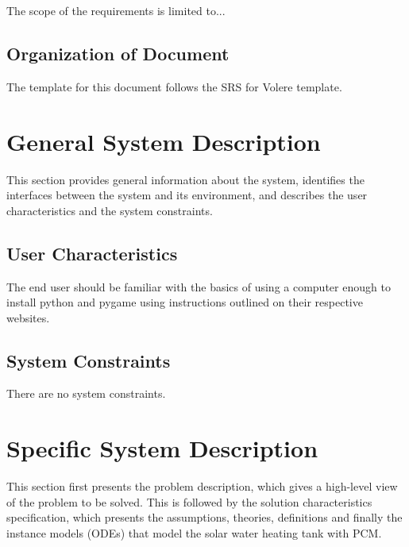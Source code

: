 \documentclass[12pt]{article}
\begin{document}
The scope of the requirements is limited to...

\subsection{Organization of Document}

The template for this document follows the SRS for Volere template.


\section{General System Description}

This section provides general information about the system,
identifies the interfaces between the system and its environment, and describes the user characteristics and the system constraints.


\subsection{User Characteristics}

The end user should be familiar with the basics of using a computer enough to install python and pygame using instructions outlined on their respective websites.

\subsection{System Constraints}

There are no system constraints.

\section{Specific System Description}

This section first presents the problem description, which gives a high-level
view of the problem to be solved.  This is followed by the solution characteristics
specification, which presents the assumptions, theories, definitions and finally
the instance models (ODEs) that model the solar water heating tank with PCM.
\end{document}
